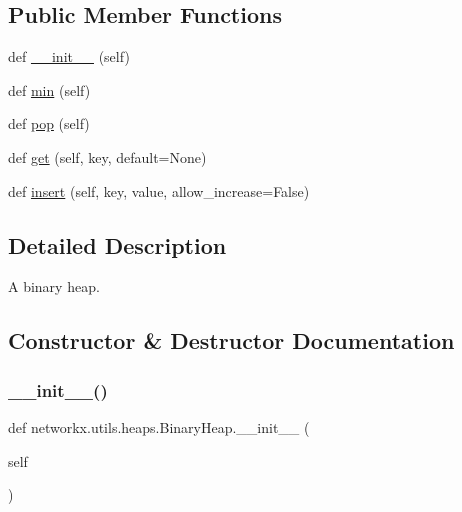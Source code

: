 \subsection*{Public Member Functions}
\begin{DoxyCompactItemize}
\item 
def \hyperlink{classnetworkx_1_1utils_1_1heaps_1_1BinaryHeap_a32acc29079a23b96fdd68835c951f8f4}{\+\_\+\+\_\+init\+\_\+\+\_\+} (self)
\item 
def \hyperlink{classnetworkx_1_1utils_1_1heaps_1_1BinaryHeap_a2228f0b77f46f7f83cfe566fb814f67e}{min} (self)
\item 
def \hyperlink{classnetworkx_1_1utils_1_1heaps_1_1BinaryHeap_add71fa1aeab6acb75dd5d24a89537782}{pop} (self)
\item 
def \hyperlink{classnetworkx_1_1utils_1_1heaps_1_1BinaryHeap_aff06c132dc42021eedafe71846dec6e3}{get} (self, key, default=None)
\item 
def \hyperlink{classnetworkx_1_1utils_1_1heaps_1_1BinaryHeap_a45a5b772ee6ff6a6e46a6fec6216c5da}{insert} (self, key, value, allow\+\_\+increase=False)
\end{DoxyCompactItemize}


\subsection{Detailed Description}
\begin{DoxyVerb}A binary heap.\end{DoxyVerb}
 

\subsection{Constructor \& Destructor Documentation}
\mbox{\label{classnetworkx_1_1utils_1_1heaps_1_1BinaryHeap_a32acc29079a23b96fdd68835c951f8f4}} 
\subsubsection{\texorpdfstring{\+\_\+\+\_\+init\+\_\+\+\_\+()}{\_\_init\_\_()}}
{\footnotesize\ttfamily def networkx.\+utils.\+heaps.\+Binary\+Heap.\+\_\+\+\_\+init\+\_\+\+\_\+ (\begin{DoxyParamCaption}\item[{}]{self }\end{DoxyParamCaption})}

